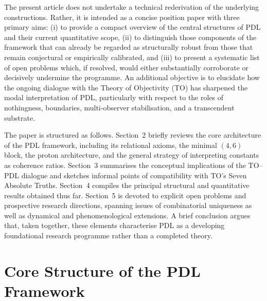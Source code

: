 \documentclass[11pt,a4paper]{article}
\begin{document}
The present article does not undertake a technical rederivation of the underlying constructions. Rather, it is intended as a concise position paper with three primary aims: (i) to provide a compact overview of the central structures of PDL and their current quantitative scope, (ii) to distinguish those components of the framework that can already be regarded as structurally robust from those that remain conjectural or empirically calibrated, and (iii) to present a systematic list of open problems which, if resolved, would either substantially corroborate or decisively undermine the programme.\cite{Laubscher2026FullPDL,Laubscher2026TopologicalReformulation} An additional objective is to elucidate how the ongoing dialogue with the Theory of Objectivity (TO) has sharpened the modal interpretation of PDL, particularly with respect to the roles of nothingness, boundaries, multi‑observer stabilisation, and a transcendent substrate.\cite{Laubscher2026DialogueTO}

The paper is structured as follows. Section~2 briefly reviews the core architecture of the PDL framework, including its relational axioms, the minimal $(4,6)$ block, the proton architecture, and the general strategy of interpreting constants as coherence ratios.\cite{Laubscher2026IntroPDL,Laubscher2026FullPDL} Section~3 summarises the conceptual implications of the TO–PDL dialogue and sketches informal points of compatibility with TO’s Seven Absolute Truths.\cite{Laubscher2026DialogueTO} Section~4 compiles the principal structural and quantitative results obtained thus far. Section~5 is devoted to explicit open problems and prospective research directions, spanning issues of combinatorial uniqueness as well as dynamical and phenomenological extensions. A brief conclusion argues that, taken together, these elements characterise PDL as a developing foundational research programme rather than a completed theory.

\section{Core Structure of the PDL Framework}
\end{document}

